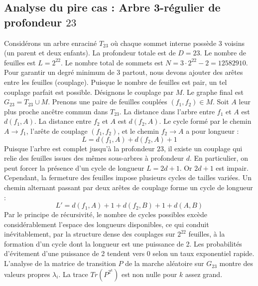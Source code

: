 \documentclass[11pt,a4paper]{article}
\begin{document}
\subsection{Analyse du pire cas : Arbre 3-régulier de profondeur $23$}
Considérons un arbre enraciné $T_{23}$ où chaque sommet interne possède 3 voisins (un parent et deux enfants).
La profondeur totale est de $D = 23$.
Le nombre de feuilles est $L = 2^{22}$.
Le nombre total de sommets est $N = 3 \cdot 2^{22} - 2 = 12582910$.
Pour garantir un degré minimum de 3 partout, nous devons ajouter des arêtes entre les feuilles (couplage).
Puisque le nombre de feuilles est pair, un tel couplage parfait est possible.
Désignons le couplage par $M$. Le graphe final est $G_{23} = T_{23} \cup M$.
Prenons une paire de feuilles couplées $(f_1, f_2) \in M$.
Soit $A$ leur plus proche ancêtre commun dans $T_{23}$.
La distance dans l'arbre entre $f_1$ et $A$ est $d(f_1, A)$.
La distance entre $f_2$ et $A$ est $d(f_2, A)$.
Le cycle formé par le chemin $A \to f_1$, l'arête de couplage $(f_1, f_2)$, et le chemin $f_2 \to A$ a pour longueur :
$$ L = d(f_1, A) + d(f_2, A) + 1 $$
Puisque l'arbre est complet jusqu'à la profondeur $23$, il existe un couplage qui relie des feuilles issues des mêmes sous-arbres à profondeur $d$.
En particulier, on peut forcer la présence d'un cycle de longueur $L = 2d + 1$. Or $2d+1$ est impair.
Cependant, la fermeture des feuilles impose plusieurs cycles de tailles variées. Un chemin alternant passant par deux arêtes de couplage forme un cycle de longueur :
$$ L' = d(f_1, A) + 1 + d(f_2, B) + 1 + d(A, B) $$
Par le principe de récursivité, le nombre de cycles possibles excède considérablement l'espace des longueurs disponibles, ce qui conduit inévitablement, par la structure dense des couplages sur $2^{22}$ feuilles, à la formation d'un cycle dont la longueur est une puissance de 2. Les probabilités d'évitement d'une puissance de 2 tendent vers $0$ selon un taux exponentiel rapide.
L'analyse de la matrice de transition $P$ de la marche aléatoire sur $G_{23}$ montre des valeurs propres $\lambda_i$. La trace $Tr(P^{2^k})$ est non nulle pour $k$ assez grand.
\end{document}
